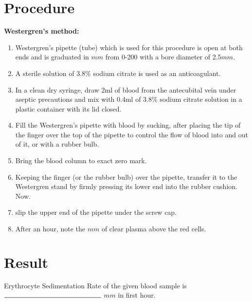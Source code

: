 \documentclass[a4paper,12pt,openany,oneside]{book}
\begin{document}
												\section*{Procedure}
												\textbf{Westergren’s method:}\newline
												\begin{enumerate}	
													\item{Westergren’s pipette (tube) which is used for this procedure is open at both ends and is graduated in $mm$ from 0-200 with a bore diameter of 2.5$mm$.}
													\item{A sterile solution of 3.8\% sodium citrate is used as an anticoagulant.}
													\item{In a clean dry syringe, draw 2ml of blood from the antecubital vein under aseptic precautions and mix with 0.4ml of 3.8\% sodium citrate solution in a plastic  container with its lid closed.}
													\item{Fill the Westergren’s pipette with blood by sucking, after placing the tip of the finger over the top of the pipette to control the flow of blood into and out of it, or with a rubber bulb.}
													\item{Bring the blood column to exact zero mark.}
													\item{Keeping the finger (or the rubber bulb) over the pipette, transfer it to the Westergren stand by firmly pressing its lower end into the rubber cushion. Now.}
													\item{slip the upper end of the pipette under the screw cap.}
													\item{After an hour, note the $mm$ of clear plasma above the red cells.}
												\end{enumerate}
												\section*{Result}
												Erythrocyte Sedimentation Rate of the given blood sample is $\rule{5cm}{0.5pt}$ $mm$ in first hour.
\end{document}
